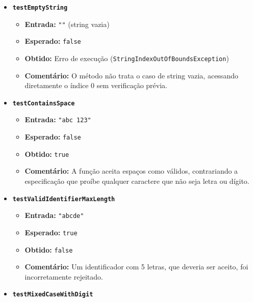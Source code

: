 \documentclass[
  letterpaper,
  DIV=11,
  numbers=noendperiod]{scrartcl}
\providecommand{\tightlist}{%
  \setlength{\itemsep}{0pt}\setlength{\parskip}{0pt}}
\begin{document}
\begin{itemize}
\tightlist
\item
  \textbf{\texttt{testEmptyString}}

  \begin{itemize}
  \tightlist
  \item
    \textbf{Entrada:} \texttt{""} (string vazia)\\
  \item
    \textbf{Esperado:} \texttt{false}\\
  \item
    \textbf{Obtido:} Erro de execução
    (\texttt{StringIndexOutOfBoundsException})\\
  \item
    \textbf{Comentário:} O método não trata o caso de string vazia,
    acessando diretamente o índice 0 sem verificação prévia.
  \end{itemize}
\item
  \textbf{\texttt{testContainsSpace}}

  \begin{itemize}
  \tightlist
  \item
    \textbf{Entrada:} \texttt{"abc\ 123"}\\
  \item
    \textbf{Esperado:} \texttt{false}\\
  \item
    \textbf{Obtido:} \texttt{true}\\
  \item
    \textbf{Comentário:} A função aceita espaços como válidos,
    contrariando a especificação que proíbe qualquer caractere que não
    seja letra ou dígito.
  \end{itemize}
\item
  \textbf{\texttt{testValidIdentifierMaxLength}}

  \begin{itemize}
  \tightlist
  \item
    \textbf{Entrada:} \texttt{"abcde"}\\
  \item
    \textbf{Esperado:} \texttt{true}\\
  \item
    \textbf{Obtido:} \texttt{false}\\
  \item
    \textbf{Comentário:} Um identificador com 5 letras, que deveria ser
    aceito, foi incorretamente rejeitado.
  \end{itemize}
\item
  \textbf{\texttt{testMixedCaseWithDigit}}


\end{itemize}
\end{document}
